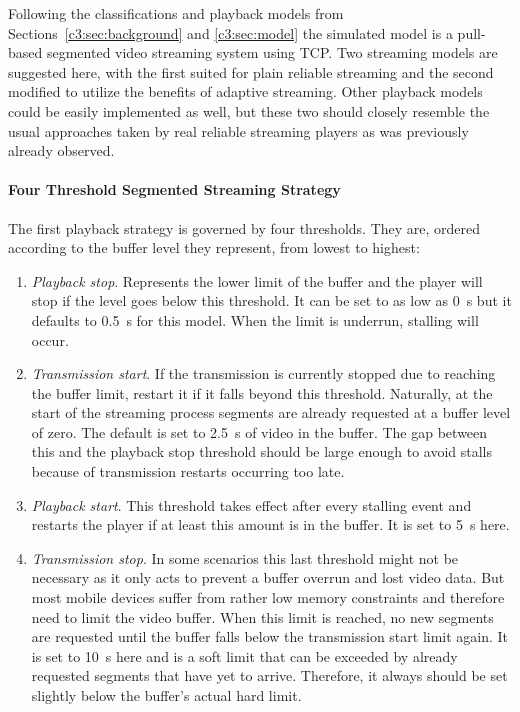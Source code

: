 Following the classifications and playback models from Sections~\ref{c3:sec:background} and \ref{c3:sec:model} the simulated model is a pull-based segmented video streaming system using \gls{TCP}. Two streaming models are suggested here, with the first suited for plain reliable streaming and the second modified to utilize the benefits of adaptive streaming. Other playback models could be easily implemented as well, but these two should closely resemble the usual approaches taken by real reliable streaming players as was previously already observed.


\paragraph{Four Threshold Segmented Streaming Strategy}

The first playback strategy is governed by four thresholds. They are, ordered according to the buffer level they represent, from lowest to highest:
%
\begin{enumerate}
	\item \textit{Playback stop}. Represents the lower limit of the buffer and the player will stop if the level goes below this threshold. It can be set to as low as \SI{0}{\second} but it defaults to \SI{0.5}{\second} for this model. When the limit is underrun, stalling will occur.

	\item \textit{Transmission start}. If the transmission is currently stopped due to reaching the buffer limit, restart it if it falls beyond this threshold. Naturally, at the start of the streaming process segments are already requested at a buffer level of zero. The default is set to \SI{2.5}{\second} of video in the buffer. The gap between this and the playback stop threshold should be large enough to avoid stalls because of transmission restarts occurring too late.

	\item \textit{Playback start}. This threshold takes effect after every stalling event and restarts the player if at least this amount is in the buffer. It is set to \SI{5}{\second} here.

	\item \textit{Transmission stop}. In some scenarios this last threshold might not be necessary as it only acts to prevent a buffer overrun and lost video data. But most mobile devices suffer from rather low memory constraints and therefore need to limit the video buffer. When this limit is reached, no new segments are requested until the buffer falls below the transmission start limit again. It is set to \SI{10}{\second} here and is a soft limit that can be exceeded by already requested segments that have yet to arrive. Therefore, it always should be set slightly below the buffer's actual hard limit.
\end{enumerate}


